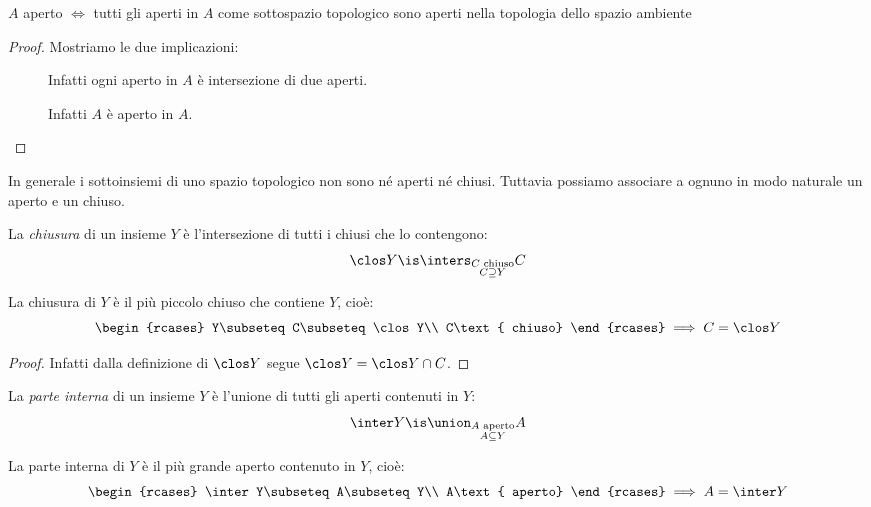 \begin{prop}
	$A$ aperto $\iff$ tutti gli aperti in $A$ come sottospazio topologico sono aperti nella topologia dello spazio ambiente
\end{prop}

\begin{proof}
	Mostriamo le due implicazioni:
	\begin{description}
		\item[\proofrightarrow]
		Infatti ogni aperto in $A$ è intersezione di due aperti.
		\item[\proofleftarrow]
		Infatti $A$ è aperto in $A$. \qedhere
	\end{description}
\end{proof}


In generale i sottoinsiemi di uno spazio topologico non sono né aperti né chiusi. Tuttavia possiamo associare a ognuno in modo naturale un aperto e un chiuso.

\begin{defn}[Chiusura]
	La \emph{chiusura} di un insieme $Y$ è l'intersezione di tutti i chiusi che lo contengono:
	\[\clos Y\is\inters_{\substack{C\text{ chiuso}\\C\supseteq Y}}C\]
\end{defn}

\begin{prop}
	La chiusura di $Y$ è il più piccolo chiuso che contiene $Y$, cioè:
	\[\begin{rcases}
		Y\subseteq C\subseteq\clos Y\\
		C\text{ chiuso}
	\end{rcases}\implies C=\clos Y\]
\end{prop}

\begin{proof}
	Infatti dalla definizione di $\clos Y$ segue $\clos Y=\clos Y\cap C$.
\end{proof}

\begin{defn}
	La \emph{parte interna} di un insieme $Y$ è l'unione di tutti gli aperti contenuti in $Y$:
	\[\inter Y\is\union_{\substack{A\text{ aperto}\\A\subseteq Y}}A\]
\end{defn}

\begin{prop}
	La parte interna di $Y$ è il più grande aperto contenuto in $Y$, cioè:
	\[\begin{rcases}
		\inter Y\subseteq A\subseteq Y\\
		A\text{ aperto}
	\end{rcases}\implies A=\inter Y\]
\end{prop}

